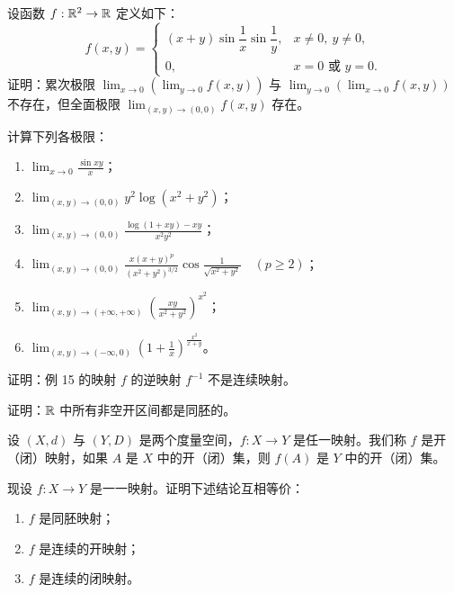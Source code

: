 \begin{exercise}
	\item 设函数 $f:\mathbb{R}^2\to\mathbb{R}$ 定义如下：
	\[f(x,y)=\begin{cases} (x+y)\sin\dfrac{1}{x}\sin\dfrac{1}{y}, & x\neq0,\ y\neq0,\\[1ex] 0, & x=0\text{ 或 }y=0. \end{cases}\]
	证明：累次极限 $\displaystyle\lim_{x\to0}\left(\lim_{y\to0}f(x,y)\right)$ 与 $\displaystyle\lim_{y\to0}\left(\lim_{x\to0}f(x,y)\right)$ 不存在，但全面极限 $\displaystyle\lim_{(x,y)\to(0,0)}f(x,y)$ 存在。
\end{exercise}

\begin{exercise}
	\item 计算下列各极限：
	\begin{enumerate}[label=\arabic*)]
		\item $\displaystyle\lim_{x\to0}\frac{\sin xy}{x}$；
		\item $\displaystyle\lim_{(x,y)\to(0,0)}y^{2}\log(x^{2}+y^{2})$；
		\item $\displaystyle\lim_{(x,y)\to(0,0)}\frac{\log(1+xy)-xy}{x^{2}y^{2}}$；
		\item $\displaystyle\lim_{(x,y)\to(0,0)}\frac{x(x+y)^{p}}{(x^{2}+y^{2})^{3/2}}\cos\frac{1}{\sqrt{x^{2}+y^{2}}}\quad(p\geqslant2)$；
		\item $\displaystyle\lim_{(x,y)\to(+\infty,+\infty)}\left(\frac{xy}{x^{2}+y^{2}}\right)^{x^{2}}$；
		\item $\displaystyle\lim_{(x,y)\to(-\infty,0)}\left(1+\frac{1}{x}\right)^{\frac{x^{2}}{x+y}}$。
	\end{enumerate}
\end{exercise}

\begin{exercise}
	\item 证明：例 15 的映射 $f$ 的逆映射 $f^{-1}$ 不是连续映射。
\end{exercise}

\begin{exercise}
	\item 证明：$\mathbb{R}$ 中所有非空开区间都是同胚的。
\end{exercise}

\begin{exercise}
	\item 设 $(X,d)$ 与 $(Y,D)$ 是两个度量空间，$f:X\to Y$ 是任一映射。我们称 $f$ 是开（闭）映射，如果 $A$ 是 $X$ 中的开（闭）集，则 $f(A)$ 是 $Y$ 中的开（闭）集。

	现设 $f:X\to Y$ 是一一映射。证明下述结论互相等价：
	\begin{enumerate}[label=\arabic*)]
		\item $f$ 是同胚映射；
		\item $f$ 是连续的开映射；
		\item $f$ 是连续的闭映射。
	\end{enumerate}
\end{exercise}

